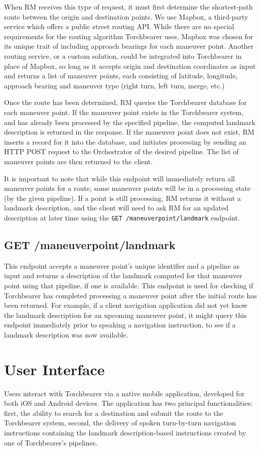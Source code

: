 When RM receives this type of request, it must first determine the shortest-path route between the origin and destination points. We use Mapbox, a third-party service which offers a public street routing API. While there are no special requirements for the routing algorithm Torchbearer uses, Mapbox was chosen for its unique trait of including approach bearings for each maneuver point. Another routing service, or a custom solution, could be integrated into Torchbearer in place of Mapbox, so long as it accepts origin and destination coordinates as input and returns a list of maneuver points, each consisting of latitude, longitude, approach bearing and maneuver type (right turn, left turn, merge, etc.)

Once the route has been determined, RM queries the Torchbearer database for each maneuver point. If the maneuver point exists in the Torchbearer system, and has already been processed by the specified pipeline, the computed landmark description is returned in the response. If the maneuver point does not exist, RM inserts a record for it into the database, and initiates processing by sending an HTTP POST request to the Orchestrator of the desired pipeline. The list of maneuver points are then returned to the client.

It is important to note that while this endpoint will immediately return all maneuver points for a route, some maneuver points will be in a processing state (by the given pipeline). If a point is still processing, RM returns it without a landmark description, and the client will need to ask RM for an updated description at later time using the \texttt{GET /maneuverpoint/landmark} endpoint.

\subsection{GET /maneuverpoint/landmark}
This endpoint accepts a maneuver point’s unique identifier and a pipeline as input and returns a description of the landmark computed for that maneuver point using that pipeline, if one is available. This endpoint is used for checking if Torchbearer has completed processing a maneuver point after the initial route has been returned. For example, if a client navigation application did not yet know the landmark description for an upcoming maneuver point, it might query this endpoint immediately prior to speaking a navigation instruction, to see if a landmark description was now available.

\section{User Interface}\label{sec:arch:ui}
Users interact with Torchbearer via a native mobile application, developed for both iOS and Android devices. The application has two principal functionalities: first, the ability to search for a destination and submit the route to the Torchbearer system, second, the delivery of spoken turn-by-turn navigation instructions containing the landmark description-based instructions created by one of Torchbearer’s pipelines.

